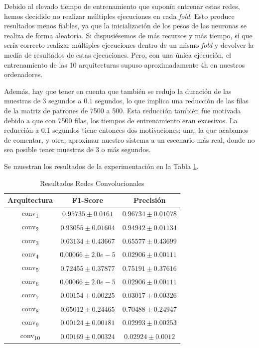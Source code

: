 \documentclass[12pt]{article}
\begin{document}
\bigskip
Debido al elevado tiempo de entrenamiento que suponía entrenar estas redes, hemos decidido
no realizar múltiples ejecuciones en cada \textit{fold}. Esto produce resultados menos fiables,
ya que la inicialización de los pesos de las neuronas se realiza de forma aleatoria. Si dispusiésemos
de más recursos y más tiempo, sí que sería correcto realizar múltiples ejecuciones dentro de un
mismo \textit{fold} y devolver la media de resultados de estas ejecuciones. Pero, con una única ejecución,
el entrenamiento de las 10 arquitecturas supuso aproximadamente 4h en nuestros ordenadores. 

\bigskip
Además, hay que tener en cuenta que también se redujo la duración de las muestras de 3 segundos a $0.1$ segundos,
lo que implica una reducción de las filas de la matriz de patrones de 7500 a 500. Esta reducción también
fue motivada debido a que con 7500 filas, los tiempos de entrenamiento eran excesivos. La reducción a $0.1$ segundos
tiene entonces dos motivaciones; una, la que acabamos de comentar, y otra, aproximar nuestro sistema a un escenario
más real, donde no sea posible tener muestras de 3 o más segundos.

\bigskip
Se muestran los resultados de la experimentación en la Tabla \ref{Tab:CONV_6}.

\begin{table}[!ht]
	\caption{Resultados Redes Convolucionales}
	\centering
		 \begin{tabular}{||c c c||}
			 \hline
			 Arquitectura & F1-Score & Precisión  \\ [0.5ex]
			 \hline\hline
			 conv\textsubscript{1} & $0.95735 \pm 0.0161$ & $0.96734 \pm 0.01078$ \\
			 \hline
			 conv\textsubscript{2} & $0.93055 \pm 0.01604$ & $0.94942 \pm 0.01134$ \\
			 \hline
			 conv\textsubscript{3} & $0.63134 \pm 0.43667$ & $0.65577 \pm 0.43699$ \\
			 \hline
			 conv\textsubscript{4} & $0.00066 \pm 2.0e-5$ & $0.02906 \pm 0.00111$ \\
			 \hline
			 conv\textsubscript{5} & $0.72455 \pm 0.37877$ & $0.75191 \pm 0.37616$ \\
			 \hline
			 conv\textsubscript{6} & $0.00066 \pm 2.0e-5$ & $0.02906 \pm 0.00111$ \\
			 \hline
			 conv\textsubscript{7} & $0.00154 \pm 0.00225$ & $0.03017 \pm 0.00326$ \\
			 \hline
			 conv\textsubscript{8} & $0.65012 \pm 0.24465$ & $0.70488 \pm 0.24947$ \\
			 \hline
			 conv\textsubscript{9} & $0.00124 \pm 0.00181$ & $0.02993 \pm 0.00253$ \\
			 \hline
			 conv\textsubscript{10} & $0.00169 \pm 0.00324$ & $0.02924 \pm 0.0012$ \\
			 \hline
		 \end{tabular}
	\label{Tab:CONV_6}
	\end{table}
\end{document}
